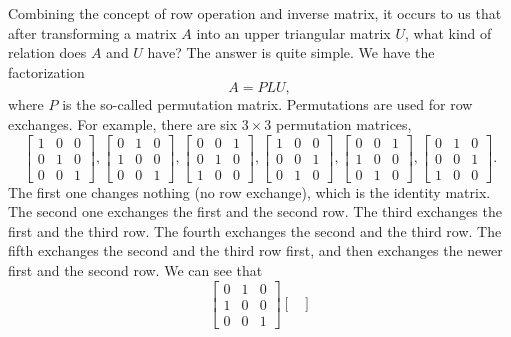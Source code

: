 \documentclass[11pt]{article}
\theoremstyle{break}
\theoremstyle{no_label}
\numberwithin{equation}{section}
\begin{document}
Combining the concept of row operation and inverse matrix, it occurs to us that after transforming a matrix $A$ into an upper triangular matrix $U$, what kind of relation does $A$ and $U$ have? The answer is quite simple. We have the factorization \begin{equation}\label{PLU}
    A=PLU,
\end{equation}
where $P$ is the so-called permutation matrix. Permutations are used for row exchanges. For example, there are six $3\times 3$ permutation matrices, $$\begin{bmatrix}
    1 & 0 & 0\\
    0 & 1 & 0\\
    0 & 0 & 1
\end{bmatrix}, \begin{bmatrix}
    0 & 1 & 0\\
    1 & 0 & 0\\
    0 & 0 & 1
\end{bmatrix}, \begin{bmatrix}
    0 & 0 & 1\\
    0 & 1 & 0\\
    1 & 0 & 0
\end{bmatrix}, \begin{bmatrix}
    1 & 0 & 0\\
    0 & 0 & 1\\
    0 & 1 & 0
\end{bmatrix}, \begin{bmatrix}
    0 & 0 & 1\\
    1 & 0 & 0\\
    0 & 1 & 0
\end{bmatrix}, \begin{bmatrix}
    0 & 1 & 0\\
    0 & 0 & 1\\
    1 & 0 & 0
\end{bmatrix}.$$ The first one changes nothing (no row exchange), which is the identity matrix. The second one exchanges the first and the second row. The third exchanges the first and the third row. The fourth exchanges the second and the third row. The fifth exchanges the second and the third row first, and then exchanges the newer first and the second row. We can see that $$\begin{bmatrix}
    0 & 1 & 0\\
    1 & 0 & 0\\
    0 & 0 & 1
\end{bmatrix}\begin{bmatrix}

\end{bmatrix}$$
\end{document}
